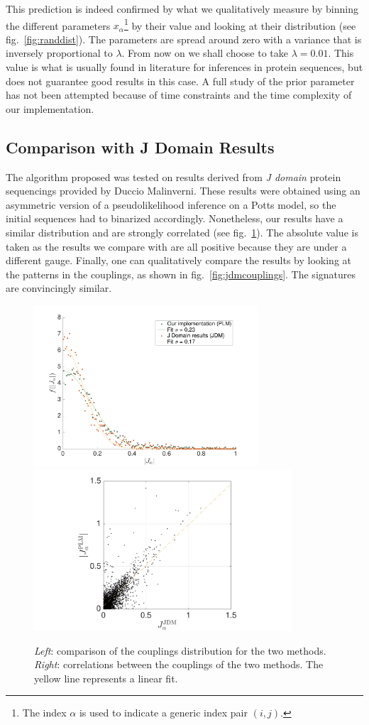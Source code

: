 \documentclass[a4paper,12pt,twoside]{article}
\begin{document}
This prediction is indeed confirmed by what we qualitatively measure by binning the different parameters $x_\alpha$\footnote{The index $\alpha$ is used to indicate a generic index pair $(i,j)$.} by their value and looking at their distribution (see fig.~\ref{fig:randdist}). 
The parameters are spread around zero with a variance that is inversely proportional to $\lambda$. 
From now on we shall choose to take $\lambda = 0.01$. 
This value is what is usually found in literature for inferences in protein sequences, but does not guarantee good results in this case.
A full study of the prior parameter has not been attempted because of time constraints and the time complexity of our implementation.
\subsection{Comparison with J Domain Results}
The algorithm proposed was tested on results derived from {\em J domain} protein sequencings provided by Duccio Malinverni.
These results were obtained using an asymmetric version of a pseudolikelihood inference on a Potts model, so the initial sequences had to binarized accordingly.
Nonetheless, our results have a similar distribution and are strongly correlated (see fig.~\ref{fig:jdmdist}).
The absolute value is taken as the results we compare with are all positive because they are under a different gauge.
Finally, one can qualitatively compare the results by looking at the patterns in the couplings, as shown in fig.~\ref{fig:jdmcouplings}. 
The signatures are convincingly similar.
\begin{figure}
  \centerline{
    \includegraphics[height=6cm,width=\textwidth,keepaspectratio]{../img/distribution_jdm.pdf}
    \includegraphics[height=6cm,width=\textwidth,keepaspectratio]{../img/correlations_jdm.pdf}
    }
  \caption{{\em Left}: comparison of the couplings distribution for the two methods. {\em Right}: correlations between the couplings of the two methods. The yellow line represents a linear fit.}
  \label{fig:jdmdist}
\end{figure}
\end{document}
